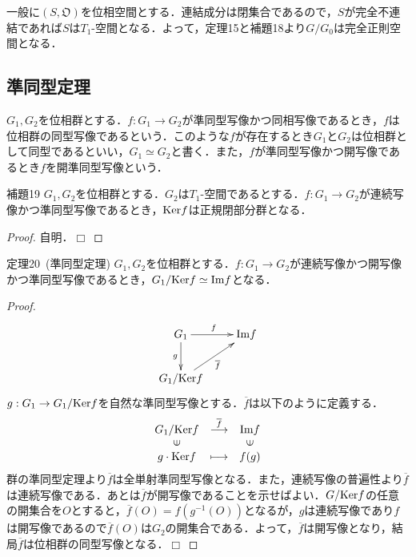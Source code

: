 \documentclass[a4paper,11pt]{jsarticle}
\newtheorem{proof}{証明}
\def\qed{\hfill $\Box$}
\begin{document}
一般に$(S,\mathfrak{O})$を位相空間とする．連結成分は閉集合であるので，$S$が完全不連結であれば$S$は$T_1$-空間となる．よって，定理15と補題18より$G/G_0$は完全正則空間となる．
%
%
%
\subsection{準同型定理}
$G_1,G_2$を位相群とする．$f:G_1\to G_2$が準同型写像かつ同相写像であるとき，$f$は位相群の同型写像であるという．このような$f$が存在するとき$G_1$と$G_2$は位相群として同型であるといい，$G_1\simeq G_2$と書く．また，$f$が準同型写像かつ開写像であるとき$f$を開準同型写像という．
\begin{itembox}[l]{補題19}
$G_1,G_2$を位相群とする．$G_2$は$T_1$-空間であるとする．$f:G_1\to G_2$が連続写像かつ準同型写像であるとき，${\rm Ker}f$は正規閉部分群となる．
\end{itembox}
\vspace{-0.7zh}%
\vspace{-0.7zh}%
\begin{proof}
自明．\qed
\end{proof}
\begin{itembox}[l]{定理20{\ }(準同型定理)}
$G_1,G_2$を位相群とする．$f:G_1\to G_2$が連続写像かつ開写像かつ準同型写像であるとき，$G_1/{\rm Ker}f\simeq {\rm Im}f$となる．
\end{itembox}
\vspace{-0.7zh}%
\vspace{-0.7zh}%
\begin{proof}
\begin{equation*}
\xymatrix{
G_1 \ar[d]_g \ar[r]^{f} & {\rm Im}f \\
G_1/{\rm Ker}f \ar[ru]_{\overline{f}}
}
\end{equation*}
$g:G_1\to G_1/{\rm Ker}f$を自然な準同型写像とする．$\overline{f}$は以下のように定義する．
\begin{eqnarray*}
\begin{array}{ccc}
G_1/{\rm Ker}f & \stackrel{\overline{f}}{\longrightarrow} & {\rm Im}f \\
\rotatebox{90}{$\in$} & & \rotatebox{90}{$\in$} \\
g\cdot {\rm Ker}f & \longmapsto & f(g)
\end{array}
\end{eqnarray*}
群の準同型定理より$\overline{f}$は全単射準同型写像となる．また，連続写像の普遍性より$\overline{f}$は連続写像である．あとは$\overline{f}$が開写像であることを示せばよい．$G/{\rm Ker}f$の任意の開集合を$O$とすると，$\overline{f}(O)=f(g^{-1}(O))$となるが，$g$は連続写像であり$f$は開写像であるので$\overline{f}(O)$は$G_2$の開集合である．よって，$\overline{f}$は開写像となり，結局$\overline{f}$は位相群の同型写像となる．\qed
\end{proof}
\end{document}
